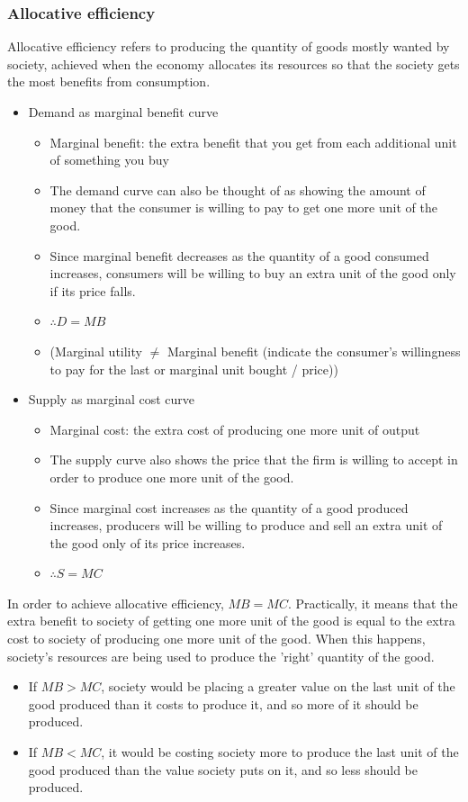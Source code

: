\documentclass[a4paper,12pt]{article}
\begin{document}
\subsubsection*{Allocative efficiency}
Allocative efficiency refers to producing the quantity of goods mostly wanted by society, achieved when the economy allocates its resources so that the society gets the most benefits from consumption. 
\begin{itemize}
  \item Demand as marginal benefit curve
  \begin{itemize}
    \item Marginal benefit: the extra benefit that you get from each additional unit of something you buy
    \item The demand curve can also be thought of as showing the amount of money that the consumer is willing to pay to get one more unit of the good.
    \item Since marginal benefit decreases as the quantity of a good consumed increases, consumers will be willing to buy an extra unit of the good only if its price falls.
    \item $\therefore D=MB$
    \item (Marginal utility $\neq$ Marginal benefit (indicate the consumer's willingness to pay for the last or marginal unit bought / price))
  \end{itemize}
  \item Supply as marginal cost curve
  \begin{itemize}
    \item Marginal cost: the extra cost of producing one more unit of output
    \item The supply curve also shows the price that the firm is willing to accept in order to produce one more unit of the good.
    \item Since marginal cost increases as the quantity of a good produced increases, producers will be willing to produce and sell an extra unit of the good only of its price increases. 
    \item $\therefore S=MC$
  \end{itemize}
\end{itemize}
In order to achieve allocative efficiency, $MB=MC$. Practically, it means that the extra benefit to society of getting one more unit of the good is equal to the extra cost to society of producing one more unit of the good. When this happens, society's resources are being
used to produce the 'right' quantity of the good.
\begin{itemize}
  \item If $MB>MC$, society would be placing a greater value on the last unit of the good produced than it costs to produce it, and so more of it should be produced.
  \item If $MB<MC$, it would be costing society more to produce the last unit of the good produced than the value society puts on it, and so less should be produced.
\end{itemize}
\end{document}
